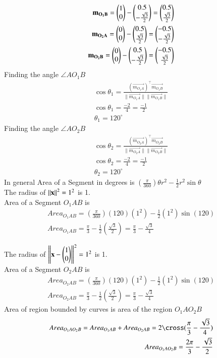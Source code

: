 \documentclass[journal,12pt,twocolumn]{IEEEtran}
\begin{document}
\begin{enumerate}
\begin{align}
     \mathbf{m_{O_1B}}=\begin{pmatrix}1\\0\end{pmatrix}-\begin{pmatrix}0.5\\-\frac{\sqrt{3}}{2}\end{pmatrix}=\begin{pmatrix}0.5\\\frac{\sqrt{3}}{2}\end{pmatrix}\\
     \mathbf{m_{O_2A}}=\begin{pmatrix}0\\0\end{pmatrix}-\begin{pmatrix}0.5\\\frac{\sqrt{3}}{2}\end{pmatrix}=\begin{pmatrix}-0.5\\-\frac{\sqrt{3}}{2}\end{pmatrix}\\
     \mathbf{m_{O_2B}}=\begin{pmatrix}0\\0\end{pmatrix}-\begin{pmatrix}0.5\\-\frac{\sqrt{3}}{2}\end{pmatrix}=\begin{pmatrix}-0.5\\\frac{\sqrt{3}}{2}\end{pmatrix}\\
\end{align}
Finding the angle $\angle A O_1 B$
\begin{align}
\cos\theta_1 = \frac{ (\vec{m_{O_1A}})^\top \vec{m_{O_1B}} } { \|\vec{m_{O_1A}} \| \|\vec{m_{O_1B}}\|  }\\
\cos\theta_1 = \frac{-2}{4}=\frac{-1}{2}\\
\theta_1 = 120^{\circ} 
\end{align}
Finding the angle $\angle A O_2 B$
\begin{align}
\cos\theta_2 = \frac{ (\vec{m_{O_2A}})^\top \vec{m_{O_2B}} } { \|\vec{m_{O_2A}} \| \|\vec{m_{O_2B}}\|  }\\
\cos\theta_2 = \frac{-2}{4}=\frac{-1}{2}\\
\theta_2 = 120^{\circ} 
\end{align}
In general Area of a Segment in degrees is $ (\frac{\pi}{360}) \theta  r^2 -\frac{1}{2} r^2 \sin\theta $\\

The radius of $ \left\lVert\mathbf{x}\right\rVert ^2 =1 ^2 $ is 1.\\
Area of a Segment $O_1 AB$ is
\begin{align} 
Area_{O_1 AB}= (\frac{\pi}{360})(120)(1^2) -\frac{1}{2}( 1^2) \sin (120)\\
Area_{O_1 AB}= \frac{\pi}{3} - \frac{1}{2}(\frac{\sqrt{3}}{2})
= \frac{\pi}{3} - \frac{\sqrt{3}}{4}
\end{align}

The radius of $ \left\lVert\mathbf{x}-\begin{pmatrix}1 \\0\end{pmatrix}\right\rVert ^2 =1 ^2 $ is 1.\\
Area of a Segment $O_2 AB$ is
\begin{align} 
Area_{O_2 AB}= (\frac{\pi}{360})(120)(1^2) -\frac{1}{2}( 1^2) \sin (120)\\
Area_{O_2 AB}= \frac{\pi}{3} - \frac{1}{2}(\frac{\sqrt{3}}{2})
= \frac{\pi}{3} - \frac{\sqrt{3}}{4}
\end{align}
Area of region bounded by curves is area of the region $O_1 A O_2 B $
\begin{align}
Area_{O_1 A O_2 B } =Area_{O_1 AB} + Area_{O_2 AB}= 2\cross (\frac{\pi}{3} - \frac{\sqrt{3}}{4})\\
Area_{O_1 A O_2 B } =\frac{2\pi}{3} - \frac{\sqrt{3}}{2}
\end{align}
\end{enumerate}
\end{document}
